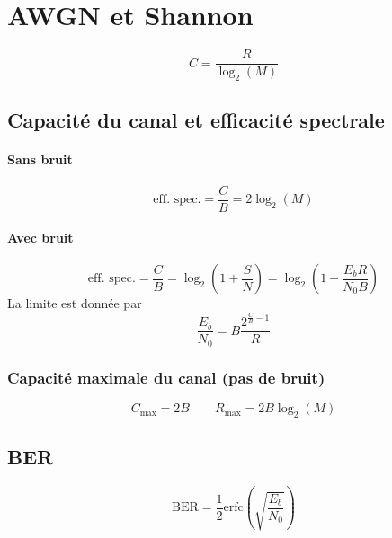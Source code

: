 \documentclass[resume]{subfiles}
\begin{document}
\section{AWGN et Shannon}
$$C=\frac{R}{\log_2(M)}$$
\subsection{Capacité du canal et efficacité spectrale}
\paragraph{Sans bruit}
$$\text{eff. spec.}=\frac{C}{B}=2\log_2(M)$$
\paragraph{Avec bruit}
$$\text{eff. spec.}=\frac{C}{B}=\log_2\left(1+\frac{S}{N}\right)=\log_2\left(1+\frac{E_bR}{N_0B}\right)$$
La limite est donnée par
$$\frac{E_b}{N_0}=B\frac{2^{\frac{C}{B}-1}}{R}$$
\subsubsection{Capacité maximale du canal (pas de bruit)}
$$C_\text{max}=2B\qquad R_\text{max}=2B\log_2(M)$$

\subsection{BER}
$$\text{BER}=\frac{1}{2}\text{erfc}\left(\sqrt{\frac{E_b}{N_0}}\right)$$
\end{document}
